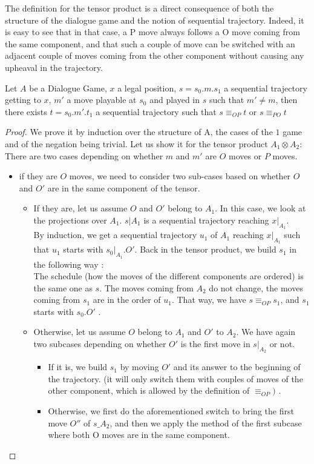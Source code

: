 \documentclass[a4paper,UKenglish]{lipics}
\begin{document}
The definition for the tensor product is a direct consequence of both the structure of the dialogue game and the notion of sequential trajectory. Indeed, it is easy to see that in that case, a P move always follows a O move coming from the same component, and that such a couple of move can be switched with an adjacent couple of moves coming from the other component without causing any upheaval in the trajectory. \\
 \begin{lemma}
Let $A$ be a Dialogue Game, $x$ a legal position, $s=s_0.m.s_1$ a sequential trajectory getting to $x$, $m'$ a move playable at $s_0$ and played in $s$ such that  $m'\neq m$, then there exists $t=s_0.m'.t_1$ a sequential trajectory such that $s\equiv_{OP} t$ or $s\equiv_{PO} t$
\end{lemma}
\begin{proof}
We prove it by induction over the structure of A, the cases of the $1$ game and of the negation being trivial. Let us show it for the tensor product $A_1 \otimes A_2$:\\
There are two cases depending on whether $m$ and $m'$ are $O$ moves or $P$ moves.
\begin{itemize}
\item if they are $O$ moves, we need to consider two sub-cases based on whether $O$ and $O'$ are in the same component of the tensor. 

\begin{itemize}
\item If they are, let us assume $O$ and $O'$ belong to $A_1$.  In this case, we look at the projections over $A_1$. $s|A_1$ is a sequential trajectory reaching $x|_{A_1}$.\\ By induction, we get a sequential trajectory $u_1$ of $A_1$ reaching $x|_{A_1}$ such that $u_1$ starts with $s_0|_{A_1}.O'$. Back in the tensor product, we build $s_1$ in the following way :\\ 
The schedule (how the moves of the different components are ordered) is the same one as $s$. The moves coming from $A_2$ do not change, the moves coming from $s_1$ are in the order of $u_1$. That way, we have $s \equiv_{OP} s_1$, and $s_1$ starts with $s_0.O'$ .\\

\item Otherwise, let us assume $O$ belong to $A_1$ and $O'$ to $A_2$. We have again two subcases depending on whether $O'$ is the first move in $s|_{A_2}$  or not.
\begin{itemize}
\item If it is, we build $s_1$ by moving $O'$ and its answer to the beginning of the trajectory. (it will only switch them with couples of moves of the other component, which is allowed by the definition of $\equiv_{OP})$ .
\item Otherwise, we first do the aforementioned switch to bring the first move  $O''$  of $s\_{A_2}$, and then we apply the method of the first subcase where both O moves are in the same component.
\end{itemize}


\end{itemize}
\end{itemize}
\end{proof}
\end{document}
